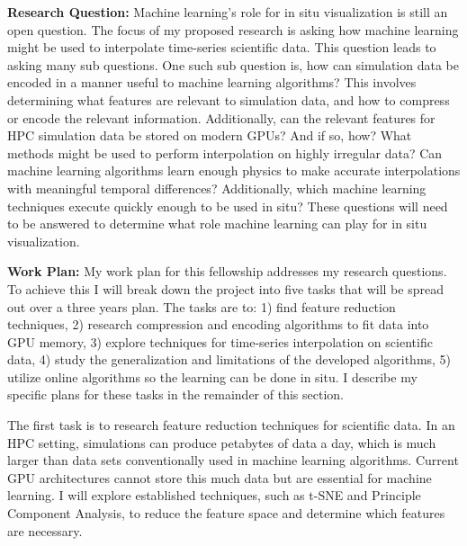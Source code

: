\documentclass[12pt]{article}
\begin{document}
\textbf{Research Question:} Machine learning's role for in situ visualization is
still an open question.
%
The focus of my proposed research is asking how machine learning might be used
to interpolate time-series scientific data. This question leads to asking many
sub questions.  One such sub question is, how can simulation data be encoded in
a manner useful to machine learning algorithms?
%
This involves determining what features are relevant to simulation data, and how
to compress or encode the relevant information. Additionally, can the relevant
features for HPC simulation data be stored on modern GPUs? And if so, how?
%
What methods might be used to perform interpolation on highly irregular data?
Can machine learning algorithms learn enough physics to make accurate
interpolations with meaningful temporal differences? 
%
Additionally, which machine learning techniques execute quickly enough to be
used in situ? 
%
These questions will need to be answered to determine what role machine
learning can play for in situ visualization.


\textbf{Work Plan:}
My work plan for this fellowship addresses my research questions.
To achieve this I will
break down the project into five tasks that will be spread out over a three
years plan. The tasks are to: 1) find feature reduction techniques, 2) research
compression and encoding algorithms to fit data into GPU memory, 3) explore
techniques for time-series interpolation on scientific data, 4) study the
generalization and limitations of the developed algorithms, 5) utilize online
algorithms so the learning can be done in situ. I describe my specific plans for
these tasks in the remainder of this section.


 The first task is to research feature reduction techniques for
scientific data. In an HPC setting, simulations can produce petabytes of data a
day, which is much larger than data sets conventionally used in machine learning
algorithms. Current GPU architectures cannot store this much data but are
essential for machine learning. I will explore established techniques, such as
t-SNE and Principle Component Analysis, to reduce the feature space and
determine which features are necessary.
\end{document}
